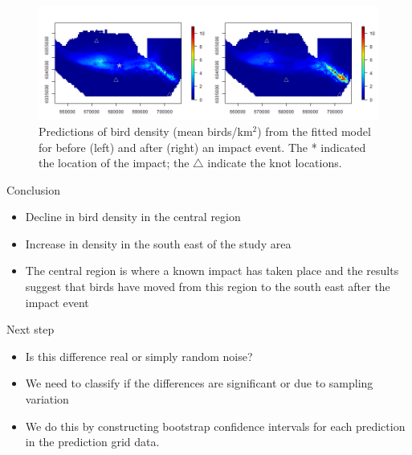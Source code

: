 \begin{figure}[h]
  \centering
  \includegraphics[width=12cm]{danish/pointEstimate.png}
  \caption{Predictions of bird density (mean birds/km$^2$) from the fitted model for before (left) and after (right) an impact event. The * indicated the location of the impact; the $\triangle$ indicate the knot locations. }
  \label{fig:offpointest}
\end{figure}

\begin{block}{Conclusion}
\begin{itemize}
  \item Decline in bird density in the central region
  \item Increase in density in the south east of the study area 
  \item The central region is where a known impact has taken place and the results suggest that birds have moved from this region to the south east after the impact event
\end{itemize}
\end{block}

\begin{block}{Next step}
\begin{itemize}
  \item Is this difference real or simply random noise?
  \item We need to classify if the differences are significant or due to sampling variation
  \item We do this by constructing bootstrap confidence intervals for each prediction in the prediction grid data.
\end{itemize}
\end{block}


